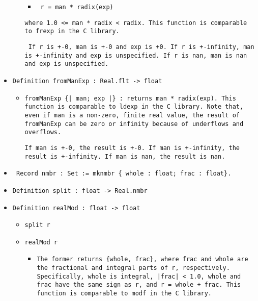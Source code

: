 \documentclass[11pt]{report}
\begin{document}
\begin{itemize}
\begin{itemize}
\begin{itemize}
\item \texttt{ r = man * radix(exp) }

\end{itemize}

\texttt{where 1.0 <= man * radix < radix. This function is comparable to frexp in the C library.}

 \begin{flushleft} \texttt{ If r is +-0, man is +-0 and exp is +0. If r is +-infinity, man is +-infinity and exp is unspecified. If r is nan, man is nan and exp is unspecified.}  \end{flushleft}

\end{itemize}

\item  \texttt{Definition fromManExp : Real.flt -> float}

\begin{itemize}
\item   \begin{flushleft} \texttt{fromManExp \{| man; exp |\} : returns man * radix(exp). This function is comparable to ldexp in the C library. Note that, even if man is a non-zero, finite real value, the result of fromManExp can be zero or infinity because of underflows and overflows.}  \end{flushleft}

 \begin{flushleft} \texttt{If man is +-0, the result is +-0. If man is +-infinity, the result is +-infinity. If man is nan, the result is nan. }  \end{flushleft}

\end{itemize}

\item \texttt{ Record nmbr : Set := mknmbr \{ whole : float; frac : float\}.}



\item  \texttt{Definition split : float -> Real.nmbr}

\item  \texttt{Definition realMod : float -> float}

\begin{itemize}
\item  \texttt{split r}

\item  \texttt{realMod r}

\begin{itemize}
\item   \begin{flushleft} \texttt{The former returns \{whole, frac\}, where frac and whole are the fractional and integral parts of r, respectively. Specifically, whole is integral, |frac| < 1.0, whole and frac have the same sign as r, and r = whole + frac. This function is comparable to modf in the C library.}


\end{flushleft}
\end{itemize}
\end{itemize}
\end{itemize}
\end{document}
